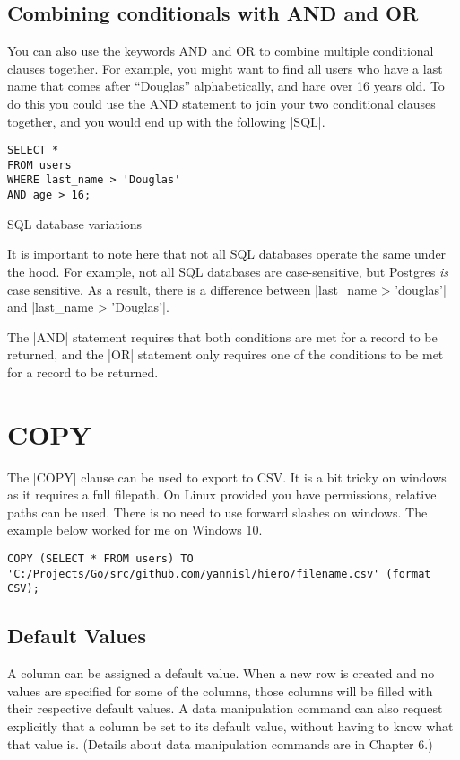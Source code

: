 \subsection{Combining conditionals with AND and OR}

You can also use the keywords AND and OR to combine multiple conditional clauses together. For example, you might want to find all users who have a last name that comes after “Douglas” alphabetically, and hare over 16 years old. To do this you could use the AND statement to join your two conditional clauses together, and you would end up with the following |SQL|.

\begin{verbatim}
SELECT *
FROM users
WHERE last_name > 'Douglas'
AND age > 16;
\end{verbatim}


SQL database variations

It is important to note here that not all SQL databases operate the same under the hood. For example, not all SQL databases are case-sensitive, but Postgres \emph{is} case sensitive. As a result, there is a difference between |last_name > 'douglas'| and |last_name > 'Douglas'|.

The |AND| statement requires that both conditions are met for a record to be returned, and the |OR| statement only requires one of the conditions to be met for a record to be returned.


\section{COPY}

The |COPY| clause can be used to export to CSV. It is a bit tricky on windows as it requires a full filepath. On Linux provided you have permissions, relative paths can be used. There is no need to use forward slashes on windows. The example below worked for me on Windows 10. 

\begin{verbatim}
COPY (SELECT * FROM users) TO 
'C:/Projects/Go/src/github.com/yannisl/hiero/filename.csv' (format CSV);
\end{verbatim}


\subsection{Default Values}

A column can be assigned a default value. When a new row is created and no values are specified for some of the columns, those columns will be filled with their respective default values. A data manipulation command can also request explicitly that a column be set to its default value, without having to know what that value is. (Details about data manipulation commands are in Chapter 6.)

